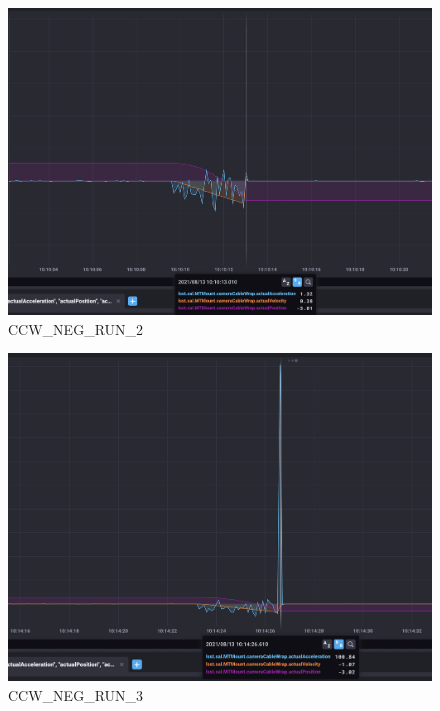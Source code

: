 \documentclass[SE,lsstdraft,authoryear,toc]{lsstdoc}
\begin{document}
\begin{figure}
  \includegraphics[width=\linewidth]{media/ccw_neg_2.png}
  \caption{CCW\_NEG\_RUN\_2}
  \label{fig:CCW_NEG_RUN_2}
\end{figure}

\begin{figure}
  \includegraphics[width=\linewidth]{media/ccw_neg_3.png}
  \caption{CCW\_NEG\_RUN\_3}
  \label{fig:CCW_NEG_RUN_3}
\end{figure}
\end{document}
